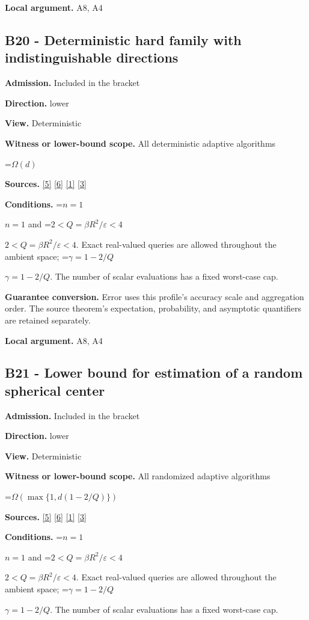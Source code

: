 \documentclass[10pt,a4paper]{article}
\newcommand{\AtlasMath}[1]{\par\begingroup\centering\setbox0=\hbox{$\displaystyle #1$}\ifdim\wd0>1.4\linewidth\typeout{ATLAS WIDE FORMULA: \the\wd0}\fi\ifdim\wd0>\linewidth\resizebox{\linewidth}{!}{\box0}\else\box0\fi\par\endgroup}
\newcommand{\AtlasInlineMath}[1]{\begingroup\setbox0=\hbox{$#1$}\ifdim\wd0>.4\linewidth\endgroup\AtlasMath{#1}\else\endgroup$#1$\fi}
\begin{document}
\textbf{Local argument.} A8, A4

\subsection{B20 - Deterministic hard family with indistinguishable directions}
\textbf{Admission.} Included in the bracket

\textbf{Direction.} lower

\textbf{View.} Deterministic

\textbf{Witness or lower-bound scope.} All deterministic adaptive algorithms

\AtlasMath{\Omega(d)}
\textbf{Sources.} \href{https://arxiv.org/html/2607.16558v2}{[5]} \href{https://www.mathnet.ru/php/archive.phtml?jrnid=mzm&option_lang=eng&paperid=1697&wshow=paper}{[6]} \href{https://arxiv.org/html/2610.00345v1}{[1]} \href{https://arxiv.org/abs/2109.08858}{[3]}

\textbf{Conditions.} \AtlasInlineMath{n=1} and \AtlasInlineMath{2<Q=\beta R^2/\varepsilon<4}. Exact real-valued queries are allowed throughout the ambient space; \AtlasInlineMath{\gamma=1-2/Q}. The number of scalar evaluations has a fixed worst-case cap.

\textbf{Guarantee conversion.} Error uses this profile's accuracy scale and aggregation order. The source theorem's expectation, probability, and asymptotic quantifiers are retained separately.

\textbf{Local argument.} A8, A4

\subsection{B21 - Lower bound for estimation of a random spherical center}
\textbf{Admission.} Included in the bracket

\textbf{Direction.} lower

\textbf{View.} Deterministic

\textbf{Witness or lower-bound scope.} All randomized adaptive algorithms

\AtlasMath{\Omega(\max\{1,d(1-2/Q)\})}
\textbf{Sources.} \href{https://arxiv.org/html/2607.16558v2}{[5]} \href{https://www.mathnet.ru/php/archive.phtml?jrnid=mzm&option_lang=eng&paperid=1697&wshow=paper}{[6]} \href{https://arxiv.org/html/2610.00345v1}{[1]} \href{https://arxiv.org/abs/2109.08858}{[3]}

\textbf{Conditions.} \AtlasInlineMath{n=1} and \AtlasInlineMath{2<Q=\beta R^2/\varepsilon<4}. Exact real-valued queries are allowed throughout the ambient space; \AtlasInlineMath{\gamma=1-2/Q}. The number of scalar evaluations has a fixed worst-case cap.
\end{document}
